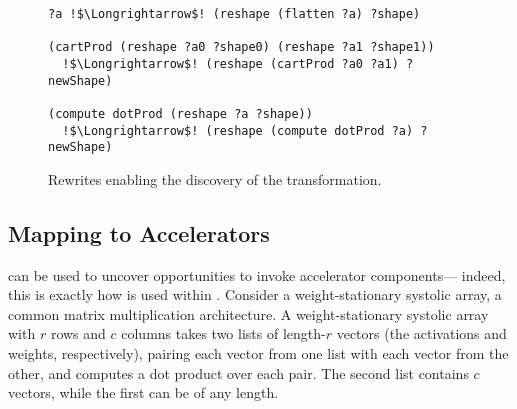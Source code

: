 \begin{figure}
\begin{lstlisting}[escapechar=!]
?a !$\Longrightarrow$! (reshape (flatten ?a) ?shape) 

(cartProd (reshape ?a0 ?shape0) (reshape ?a1 ?shape1))
  !$\Longrightarrow$! (reshape (cartProd ?a0 ?a1) ?newShape)
  
(compute dotProd (reshape ?a ?shape)) 
  !$\Longrightarrow$! (reshape (compute dotProd ?a) ?newShape)
\end{lstlisting}
\caption{Rewrites enabling the discovery of the \itc transformation.}
\label{fig:im2col-rewrites}
\end{figure}



\subsection{Mapping  to Accelerators}
\label{sec:case-study-tensorization}


\g can be used to uncover opportunities
  to invoke accelerator components---%
  indeed, this is exactly how \g
  is used
  within \TLA.
Consider a 
  weight-stationary systolic array,
  a common matrix multiplication
  architecture.
A weight-stationary
  systolic array
  with $r$ rows
  and $c$ columns
  takes two lists
  of length-$r$ vectors
  (the activations
    and weights, respectively),
  pairing each vector
  from one list
  with each vector
  from the other,
  and computes a dot product
  over each pair.
The second list
  contains $c$ vectors,
  while the first
  can be of any length.

